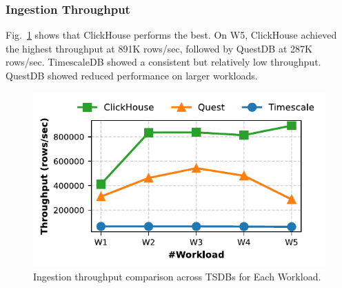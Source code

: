 \documentclass[conference]{IEEEtran}
\begin{document}
\subsubsection{Ingestion Throughput}
Fig.~\ref{fig:ingestion_throughput_comparison} shows that ClickHouse performs the best. On W5, ClickHouse achieved the highest throughput at 891K rows/sec, followed by QuestDB at 287K rows/sec. TimescaleDB showed a consistent but relatively low throughput. QuestDB showed reduced performance on larger workloads.
\begin{figure}[tb]
\centering
\includegraphics[width=1.0\linewidth]{2_ing_throughput_plot.pdf}
\caption{Ingestion throughput comparison across TSDBs for Each Workload.}
\label{fig:ingestion_throughput_comparison}
\end{figure}
\end{document}
